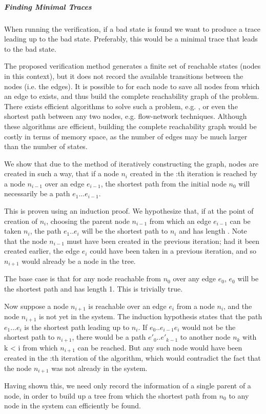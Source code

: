 \subparagraph{Finding Minimal Traces}
When running the verification, if a bad state is found we want to produce a trace leading up to the bad state. Preferably, this would be a minimal trace that leads to the bad state.
 
The proposed verification method generates a finite set of reachable states (nodes in this context), but it does not record the available transitions between the nodes (i.e. the edges). It is possible to for each node  to save all nodes  from which an edge to  exists, and thus build the complete reachability graph of the problem. There exists efficient algorithms to solve such a problem, e.g. , or even the shortest path between any two nodes, e.g. flow-network techniques. Although these algorithms are efficient, building the complete reachability graph would be costly in terms of memory space, as the number of edges may be much larger than the number of states.

 
We show that due to the method of iteratively constructing the graph, nodes are created in such a way, that if a node $n_{i}$ created in the :th iteration is reached by a node $n_{i-1}$ over an edge $e_{i-1}$, the shortest path from the initial node $n_0$ will necessarily be a path $e_1...e_{i-1}$.
 
 This is proven using an induction proof. We hypothesize that, if at the point of creation of $n_i$, choosing the parent node $n_{i-1}$ from which an edge $e_{i-1}$ can be taken $n_i$, the path $e_1..e_{i}$ will be the shortest path to $n_i$ and has length . Note that the node $n_{i-1}$ must have been created in the previous iteration; had it been created earlier, the edge $e_i$ could have been taken in a previous iteration, and so $n_{i+1}$ would already be a node in the tree.
 
The base case is that for any node reachable from $n_0$ over any edge $e_0$, $e_0$ will be the shortest path and has length 1. This is trivially true.
 
Now suppose a node $n_{i+1}$ is reachable over an edge $e_i$ from a node $n_i$, and the node $n_{i+1}$ is not yet in the system. The induction hypothesis states that the path $e_1...e_i$ is the shortest path leading up to $n_i$. If $e_0..e_{i-1}e_i$ would not be the shortest path to $n_{i+1}$, there would be a path $e'_0..e'_{k-1}$ to another node $n_k$ with k < i from which $n_{i+1}$ can be reached. But any such node would have been created in the :th iteration of the algorithm, which would contradict the fact that the node $n_{i+1}$ was not already in the system.
 
Having shown this, we need only record the information of a single parent of a node, in order to build up a tree from which the shortest path from $n_0$ to any node in the system can efficiently be found.


\swreceiver

\swobserver

\swsender
